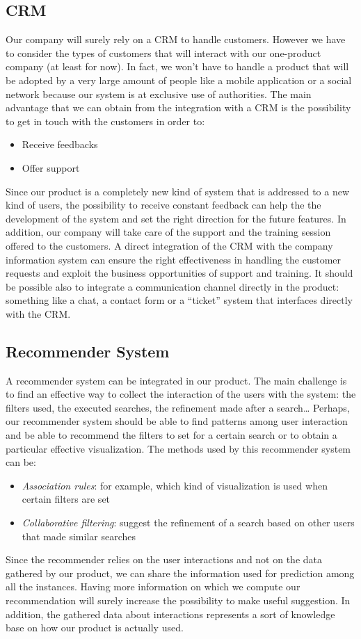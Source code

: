 \documentclass[../main.tex]{subfiles}
\begin{document}
    \subsection{CRM}
    Our company will surely rely on a CRM to handle customers. However we have to consider the types of customers that will interact with our one-product company (at least for now). In fact, we won’t have to handle a product that will be adopted by a very large amount of people like a mobile application or a social network because our system is at exclusive use of authorities.
    The main advantage that we can obtain from the integration with a CRM is the possibility to get in touch with the customers in order to:
    \begin{itemize}
        \item Receive feedbacks
        \item Offer support
    \end{itemize}
    Since our product is a completely new kind of system that is addressed to a new kind of users, the possibility to receive constant feedback can help the the development of the system and set the right direction for the future features.
    In addition, our company will take care of the support and the training session offered to the customers. A direct integration of the CRM with the company information system can ensure the right effectiveness in handling the customer requests and exploit the business opportunities of support and training.
    It should be possible also to integrate a communication channel directly in the product: something like a chat, a contact form or a “ticket” system that interfaces directly with the CRM.
    \subsection{Recommender System}
    A recommender system can be integrated in our product. The main challenge is to find an effective way to collect the interaction of the users with the system: the filters used, the executed searches, the refinement made after a search…
    Perhaps, our recommender system should be able to find patterns among user interaction and be able to recommend the filters to set for a certain search or to obtain a particular effective visualization.
    The methods used by this recommender system can be:
    \begin{itemize}
        \item \textit{Association rules}: for example, which kind of visualization is used when certain filters are set
        \item \textit{Collaborative filtering}: suggest the refinement of a search based on other users that made similar searches
    \end{itemize}
    Since the recommender relies on the user interactions and not on the data gathered by our product, we can share the information used for prediction among all the instances. Having more information on which we compute our recommendation will surely increase the possibility to make useful suggestion. In addition, the gathered data about interactions represents a sort of knowledge base on how our product is actually used.
\end{document}
